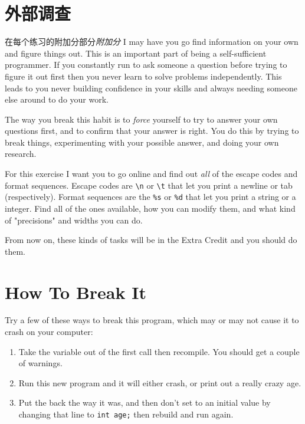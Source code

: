 \section{外部调查}

在每个练习的附加分部分\emph{附加分} I may have you go
find information on your own and figure things out.  This is an important
part of being a self-sufficient programmer.  If you constantly run to
ask someone a question before trying to figure it out first then you
never learn to solve problems independently.  This leads to you never
building confidence in your skills and always needing someone else
around to do your work.

The way you break this habit is to \emph{force} yourself to try to answer
your own questions first, and to confirm that your answer is right.  You
do this by trying to break things, experimenting with your possible answer,
and doing your own research.

For this exercise I want you to go online and find out \emph{all} of the
 escape codes and format sequences.  Escape codes are 
\verb|\n| or \verb|\t| that let you print a newline or tab (respectively).
Format sequences are the \verb|%s| or \verb|%d| that let you print a 
string or a integer.  Find all of the ones available, how you can
modify them, and what kind of "precisions" and widths you can do.

From now on, these kinds of tasks will be in the Extra Credit and you
should do them.

\section{How To Break It}

Try a few of these ways to break this program, which may or may
not cause it to crash on your computer:

\begin{enumerate}
\item Take the  variable out of the first  call
    then recompile. You should get a couple of warnings.
\item Run this new program and it will either crash, or print out a really
    crazy age.
\item Put the  back the way it was, and then don't set 
    to an initial value by changing that line to \verb|int age;| then
    rebuild and run again.
\end{enumerate}


